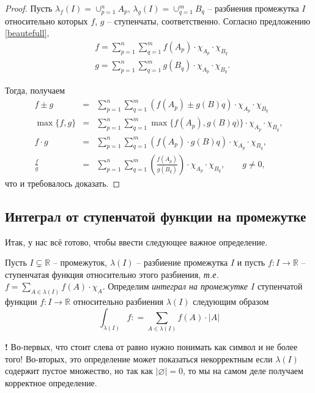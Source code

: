 \begin{proof}

Пусть $\lambda_f(I)  =  \cup_{p=1}^n A_p$, $\lambda_g(I) =  \cup_{q=1}^m B_q$ -- разбиения промежутка $I$ относительно которых $f$, $g$ -- ступенчаты, соответственно. Согласно предложению \ref{beautefull},
  \begin{align*}
        & f =  \sum_{p=1}^n\sum_{q=1}^m f(A_p) \cdot \chi_{A_p}\cdot \chi_{B_q}\\
        & g=  \sum_{p=1}^n\sum_{q=1}^m g(B_q) \cdot \chi_{A_p} \cdot \chi_{B_q}.
    \end{align*}

Тогда, получаем
\begin{eqnarray*}
    f \pm g &=& \sum_{p=1}^n\sum_{q=1}^m (f(A_p) \pm g(B)q) \cdot \chi_{A_p}\cdot \chi_{B_q} \\
     \max\{f ,g\} &=& \sum_{p=1}^n\sum_{q=1}^m \max\{f(A_p), g(B)q)\} \cdot \chi_{A_p}\cdot \chi_{B_q},\\
      f \cdot g &=& \sum_{p=1}^n\sum_{q=1}^m (f(A_p) \cdot g(B)q) \cdot \chi_{A_p}\cdot \chi_{B_q},\\
     \frac{f}{ g} &=& \sum_{p=1}^n\sum_{q=1}^m \left(\frac{f(A_p)}{ g(B_q)}\right) \cdot \chi_{A_p}\cdot \chi_{B_q},\qquad g \ne 0,
\end{eqnarray*}
что и требовалось доказать.
\end{proof}

\subsection{Интеграл от ступенчатой функции на промежутке}

Итак, у нас всё готово, чтобы ввести следующее важное определение.

\begin{definition}\label{int_of_p.c_on_I}
    Пусть $I \subsetneq \mathbb{R}$ -- промежуток, $\lambda(I)$ -- разбиение промежутка $I$ и пусть $f:I \to \mathbb{R}$ -- ступенчатая функция относительно этого разбиения, \textit{т.е.} $f = \sum_{A \in \lambda(I)}f(A) \cdot \chi_A$. Определим \textit{интеграл на промежутке $I$} ступенчатой функции $f:I \to \mathbb{R}$ относительно разбиения $\lambda(I)$ следующим образом
    \[
     \int_{\lambda(I)}f: =  \sum_{A \in \lambda(I)} f(A)\cdot |A|
    \]
\end{definition}

\begin{mydanger}{\bf !}
     Во-первых, что стоит слева от равно нужно понимать как символ и не более того! Во-вторых, это определение может показаться некорректным если $\lambda(I)$ содержит пустое множество, но так как $|\varnothing| = 0$, то мы на самом деле получаем корректное определение.     
\end{mydanger}

